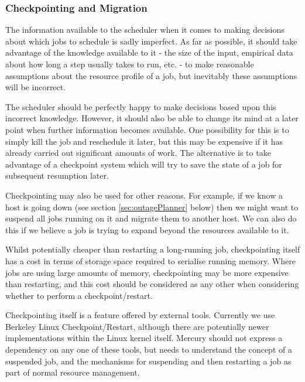 \documentclass[10pt,a4paper]{article}
\newcommand{\npar}{\par\noindent\space}
\begin{document}
\subsubsection{Checkpointing and Migration}
\npar The information available to the scheduler when it comes to making decisions about which jobs to schedule is sadly imperfect. As far as possible, it should take advantage of the knowledge available to it - the size of the input, empirical data about how long a step usually takes to run, etc. - to make reasonable assumptions about the resource profile of a job, but inevitably these assumptions will be incorrect.
\npar The scheduler should be perfectly happy to make decisions based upon this incorrect knowledge. However, it should also be able to change its mind at a later point when further information becomes available. One possibility for this is to simply kill the job and reschedule it later, but this may be expensive if it has already carried out significant amounts of work. The alternative is to take advantage of a \gls{checkpoint} system which will try to save the state of a job for subsequent resumption later.
\npar Checkpointing may also be used for other reasons. For example, if we know a host is going down (see section \ref{sec:outagePlanner} below) then we might want to suspend all jobs running on it and migrate them to another host. We can also do this if we believe a job is trying to expand beyond the resources available to it.
\npar Whilst potentially cheaper than restarting a long-running job, checkpointing itself has a cost in terms of storage space required to serialise running memory. Where jobs are using large amounts of memory, checkpointing may be more expensive than restarting, and this cost should be considered as any other when considering whether to perform a checkpoint/restart.
\npar Checkpointing itself is a feature offered by external tools. Currently we use Berkeley Linux Checkpoint/Restart, although there are potentially newer implementations within the Linux kernel itself. Mercury should not express a dependency on any one of these tools, but needs to understand the concept of a suspended job, and the mechanisms for suspending and then restarting a job as part of normal resource management.
\end{document}

